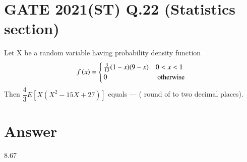 \documentclass[journal,12pt,twocolumn]{IEEEtran}
\begin{document}
\section{GATE 2021(ST) Q.22 (Statistics section)}
Let X be a random variable having probability density function 
\begin{align*}
\label{eq:qpdf_X}
f\left(x\right) = 
\begin{cases}
\frac{3}{13}(1-x)(9-x) & 0 < x < 1
\\
0 & \text{ otherwise}
\end{cases}
\end{align*}
Then $\dfrac{4}{3} E [X(X^2 -15X + 27 ) ] $ equals --- ( round of to two decimal places). \\
\section{Answer}
8.67
\end{document}
